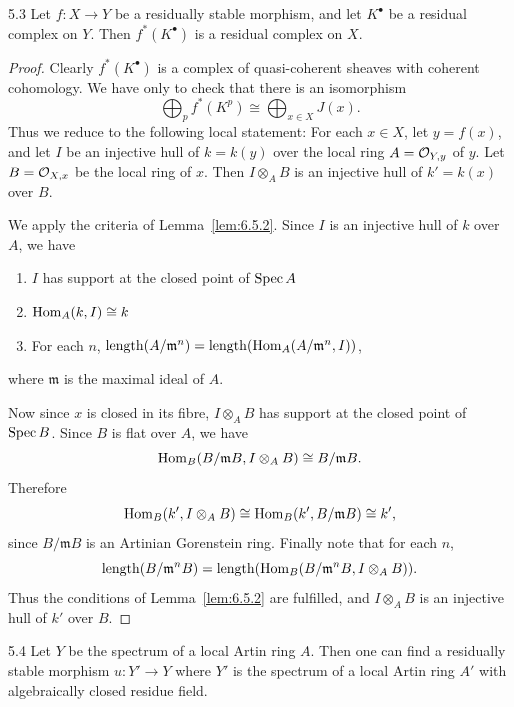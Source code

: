 \par\endgroup

\begingroup
\setlength{\emergencystretch}{2em}
\begin{bookproposition}{5.3}\label{prop:6.5.3}
Let $f\colon X\to Y$ be a residually stable morphism, and let $K^\bullet$ be a residual complex on $Y$. Then $f^{*}(K^\bullet)$ is a residual complex on $X$.
\end{bookproposition}

\begin{proof}
Clearly $f^{*}(K^\bullet)$ is a complex of quasi-coherent sheaves with coherent cohomology. We have only to check that there is an isomorphism
\[
\bigoplus_{p} f^{*}(K^{p}) \cong \bigoplus_{x\in X} J(x).
\]
Thus we reduce to the following local statement: For each $x\in X$, let $y=f(x)$, and let $I$ be an injective hull of $k=k(y)$ over the local ring $A=\mathcal{O}_{Y,y}$ of $y$. Let $B=\mathcal{O}_{X,x}$ be the local ring of $x$. Then $I\otimes_A B$ is an injective hull of $k'=k(x)$ over $B$.

We apply the criteria of Lemma~\ref{lem:6.5.2}. Since $I$ is an injective hull of $k$ over $A$, we have
\begin{enumerate}
\item[a)] $I$ has support at the closed point of $\operatorname{Spec} A$
\item[b)] $\operatorname{Hom}_{A}(k,I)\cong k$
\item[c)] For each $n$, $\operatorname{length}(A/\mathfrak{m}^{n}) = \operatorname{length}(\operatorname{Hom}_A(A/\mathfrak{m}^{n}, I))$,
\end{enumerate}
where $\mathfrak{m}$ is the maximal ideal of $A$.

Now since $x$ is closed in its fibre, $I\otimes_A B$ has support at the closed point of $\operatorname{Spec} B$. Since $B$ is flat over $A$, we have
\[
\operatorname{Hom}_{B}(B/\mathfrak{m}B, I\otimes_A B) \cong B/\mathfrak{m}B.
\]
Therefore
\[
\operatorname{Hom}_{B}(k', I\otimes_A B) \cong \operatorname{Hom}_{B}(k', B/\mathfrak{m}B) \cong k',
\]
since $B/\mathfrak{m}B$ is an Artinian Gorenstein ring. Finally note that for each $n$,
\[
\operatorname{length}(B/\mathfrak{m}^{n}B) = \operatorname{length}(\operatorname{Hom}_B(B/\mathfrak{m}^{n}B, I\otimes_A B)).
\]
Thus the conditions of Lemma~\ref{lem:6.5.2} are fulfilled, and $I\otimes_A B$ is an injective hull of $k'$ over $B$.
\end{proof}

\begin{bookproposition}{5.4}\label{prop:6.5.4}
Let $Y$ be the spectrum of a local Artin ring $A$. Then one can find a residually stable morphism $u\colon Y'\to Y$ where $Y'$ is the spectrum of a local Artin ring $A'$ with algebraically closed residue field.
\end{bookproposition}

